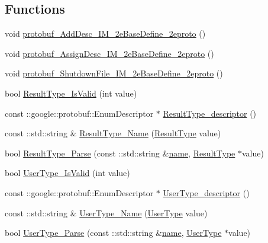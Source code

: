 \subsection*{Functions}
\begin{DoxyCompactItemize}
\item 
void \hyperlink{namespace_i_m_1_1_base_define_af2e513beb5a91ae3e28f2e32a185f5b7}{protobuf\+\_\+\+Add\+Desc\+\_\+\+I\+M\+\_\+2e\+Base\+Define\+\_\+2eproto} ()
\item 
void \hyperlink{namespace_i_m_1_1_base_define_aad4d6b4ca1b2021a73a99da03872ec10}{protobuf\+\_\+\+Assign\+Desc\+\_\+\+I\+M\+\_\+2e\+Base\+Define\+\_\+2eproto} ()
\item 
void \hyperlink{namespace_i_m_1_1_base_define_ae39c0e48cc3437f5a9f8b103899fa0d3}{protobuf\+\_\+\+Shutdown\+File\+\_\+\+I\+M\+\_\+2e\+Base\+Define\+\_\+2eproto} ()
\item 
bool \hyperlink{namespace_i_m_1_1_base_define_a2c4d51a9f137cf5f6a30aa417dcf5031}{Result\+Type\+\_\+\+Is\+Valid} (int value)
\item 
const \+::google\+::protobuf\+::\+Enum\+Descriptor $\ast$ \hyperlink{namespace_i_m_1_1_base_define_a9db52638a3e9d4fcf80de88c6b011245}{Result\+Type\+\_\+descriptor} ()
\item 
const \+::std\+::string \& \hyperlink{namespace_i_m_1_1_base_define_ac24a9d542dcecfb5a9c738fcc609530b}{Result\+Type\+\_\+\+Name} (\hyperlink{namespace_i_m_1_1_base_define_a1ff972f1012ff296dacbebee9e66e70f}{Result\+Type} value)
\item 
bool \hyperlink{namespace_i_m_1_1_base_define_a16622532c62dbf0aa40cb0927745b0c1}{Result\+Type\+\_\+\+Parse} (const \+::std\+::string \&\hyperlink{http__parser_8c_a8f8f80d37794cde9472343e4487ba3eb}{name}, \hyperlink{namespace_i_m_1_1_base_define_a1ff972f1012ff296dacbebee9e66e70f}{Result\+Type} $\ast$value)
\item 
bool \hyperlink{namespace_i_m_1_1_base_define_a849567a74af547eb303e1c087c21f8c8}{User\+Type\+\_\+\+Is\+Valid} (int value)
\item 
const \+::google\+::protobuf\+::\+Enum\+Descriptor $\ast$ \hyperlink{namespace_i_m_1_1_base_define_a5a4d6de56ddfd901fd9b5acd6b320071}{User\+Type\+\_\+descriptor} ()
\item 
const \+::std\+::string \& \hyperlink{namespace_i_m_1_1_base_define_a5d3b594041ee7d8ba2f77d8b368aee0d}{User\+Type\+\_\+\+Name} (\hyperlink{namespace_i_m_1_1_base_define_a6e0b9bb7c94e3e0e512f9dc7ca69cb83}{User\+Type} value)
\item 
bool \hyperlink{namespace_i_m_1_1_base_define_ab8a1cba18111a5301741ed93ae22cc83}{User\+Type\+\_\+\+Parse} (const \+::std\+::string \&\hyperlink{http__parser_8c_a8f8f80d37794cde9472343e4487ba3eb}{name}, \hyperlink{namespace_i_m_1_1_base_define_a6e0b9bb7c94e3e0e512f9dc7ca69cb83}{User\+Type} $\ast$value)

\end{DoxyCompactItemize}
